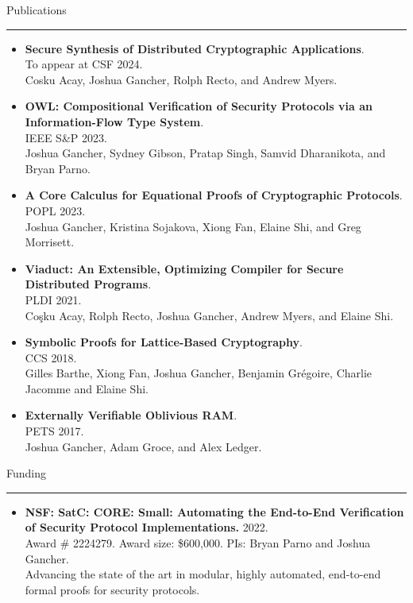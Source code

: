 \documentclass{article}
\newcommand{\rsection}[1]{\vspace{1em} {\huge #1} \vspace{0.5em} \hrule \vspace{1em}}
\begin{document}
\rsection{Publications}
\begin{itemize}[leftmargin=*]
    \item {\bf Secure Synthesis of Distributed Cryptographic Applications}. \\
        To appear at CSF 2024. \\ 
        Cosku Acay, Joshua Gancher, Rolph Recto, and Andrew Myers.
    \item {\bf OWL: Compositional Verification of Security Protocols
        via an Information-Flow Type System}. \\ IEEE S\&P 2023. \\
    Joshua Gancher, Sydney Gibson, Pratap Singh, Samvid Dharanikota, and Bryan
        Parno.
    \item {\bf A Core Calculus for Equational Proofs of Cryptographic
        Protocols}. \\ POPL 2023. \\ Joshua Gancher, Kristina Sojakova, Xiong Fan,
        Elaine Shi, and Greg Morrisett.  
    \item {\bf Viaduct: An Extensible, Optimizing Compiler for Secure
        Distributed Programs}. \\ PLDI 2021.
        \\
        Coşku Acay, Rolph Recto, Joshua Gancher, Andrew Myers, and Elaine Shi.
    \item \textbf{Symbolic Proofs for Lattice-Based Cryptography}. \\ CCS 2018. 
        \\
    {Gilles Barthe, Xiong Fan, Joshua Gancher, Benjamin Grégoire, Charlie Jacomme and Elaine Shi.}
    \item \textbf{Externally Verifiable Oblivious RAM}. \\ PETS 2017.
        \\
    Joshua Gancher, Adam Groce, and Alex Ledger.
\end{itemize}

\rsection{Funding}
 \begin{itemize}[leftmargin=*]
     \item {\bf NSF: SatC: CORE: Small: Automating the End-to-End Verification
         of Security Protocol Implementations.} 2022.
         \\
         Award \# 2224279. Award size: \$600,000. PIs: Bryan Parno and Joshua
         Gancher.
         \\
         Advancing the state of the art in modular, highly automated, end-to-end formal
         proofs for security protocols. 
 \end{itemize}
\end{document}

